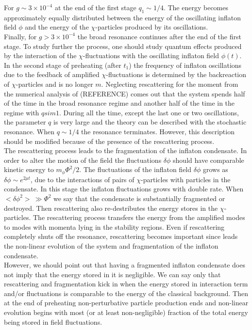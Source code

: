 \documentclass[11pt,a4paper,twoside]{book}
\begin{document}
 For $ g\sim 3 \times 10^{-4} $ at the end of the first stage $ q_{1} \sim 1/4 $. The energy becomes approximately equally distributed between the energy of the oscillating inflaton field $\phi$ and the energy of the $\chi$-particles produced by its oscillations.\\
 Finally, for $ g > 3 \times 10^{-4} $ the broad resonance continues after  the end of the first stage.  To study further the process, one should study quantum effects produced by the interaction of the $ \chi $-fluctuations with the oscillating inflaton field $\phi(t)$.\\
 In the second stage of preheating (after $ t_{1} $) the frequency  of inflaton oscillations due to the feedback of amplified $ \chi $-fluctuations is determined by the backreaction of $ \chi $-particles and is no longer $ m $.
 Neglecting rescattering for the moment from the numerical analysis of (REFERENCE) comes out that the system  spends half of the time in the broad resonance regime and another half of the time in the regime with $ q sim 1 $. During all the time, except the last one or two oscillations, the parameter $ q $ is very large and the theory can be described with the stochastic resonance. When $ q\sim 1/4 $ the resonance terminates. However, this description should be modified because of the presence of the rescattering process. \\
 The rescattering process leads to the fragmentation of the inflaton condensate. In  order to alter the motion of the field the fluctuations $ \delta \phi $ should have comparable kinetic energy to $ m_{\phi}\Phi^{2}/2 $. The fluctuations of the inflaton field $\delta \phi $ grows as $\delta \phi \sim e^{2\mu t}$, due to the interactions of pairs of $\chi$-particles with particles in the condensate. In this stage the inflaton fluctuations grows with double rate. When $ <\delta \phi^{2}>\ \gg \Phi^{2}  $ we say that the condensate is substantially fragmented or destroyed. Then rescattering also re-destributes the energy stores in the $\chi$-particles. The rescattering process transfers the energy from the amplified  modes to modes with momenta lying in the stability regions. Even if rescattering completely shuts off the resonance, rescattering becomes important since leads the non-linear evolution of the system and fragmentation of the inflaton condensate.\\
 However, we should point out that having a fragmented inflaton condensate does not imply that the energy stored in it is negligible. We can say only that rescattering and fragmentation kick in when the energy stored in interaction term and/or fluctuations is comparable to the energy of the classical background. Then at the end of preheating non-perturbative particle production ends and non-linear evolution begins with most (or at least non-negligible) fraction of the total energy being stored in field fluctuations.\\
\end{document}
